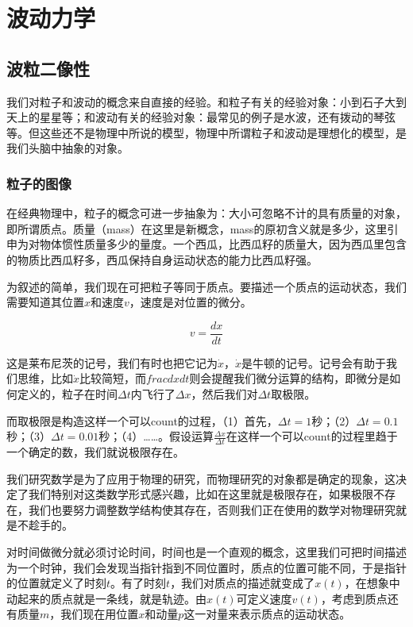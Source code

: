 \section{波动力学}


\subsection{波粒二像性}


我们对粒子和波动的概念来自直接的经验。和粒子有关的经验对象：小到石子大到天上的星星等；和波动有关的经验对象：最常见的例子是水波，还有拨动的琴弦等。但这些还不是物理中所说的模型，物理中所谓粒子和波动是理想化的模型，是我们头脑中抽象的对象。


\subsubsection{粒子的图像}


在经典物理中，粒子的概念可进一步抽象为：大小可忽略不计的具有质量的对象，即所谓质点。质量（mass）在这里是新概念，mass的原初含义就是多少，这里引申为对物体惯性质量多少的量度。一个西瓜，比西瓜籽的质量大，因为西瓜里包含的物质比西瓜籽多，西瓜保持自身运动状态的能力比西瓜籽强。

为叙述的简单，我们现在可把粒子等同于质点。要描述一个质点的运动状态，我们需要知道其位置$x$和速度$v$，速度是对位置的微分。

\begin{equation}
v = \frac{d x}{d t}
\end{equation}

这是莱布尼茨的记号，我们有时也把它记为$\dot x$，$\dot x$是牛顿的记号。记号会有助于我们思维，比如$\dot x$比较简短，而$frac{d x}{d t}$则会提醒我们微分运算的结构，即微分是如何定义的，粒子在时间$\Delta t$内飞行了$\Delta x$，然后我们对$\Delta t$取极限。

而取极限是构造这样一个可以count的过程，（1）首先，$\Delta t = 1$秒；（2）$\Delta t = 0.1$秒；（3）$\Delta t = 0.01$秒；（4）……。假设运算$\frac{\Delta x }{\Delta t}$在这样一个可以count的过程里趋于一个确定的数，我们就说极限存在。

我们研究数学是为了应用于物理的研究，而物理研究的对象都是确定的现象，这决定了我们特别对这类数学形式感兴趣，比如在这里就是极限存在，如果极限不存在，我们也要努力调整数学结构使其存在，否则我们正在使用的数学对物理研究就是不趁手的。

对时间做微分就必须讨论时间，时间也是一个直观的概念，这里我们可把时间描述为一个时钟，我们会发现当指针指到不同位置时，质点的位置可能不同，于是指针的位置就定义了时刻$t$。有了时刻$t$，我们对质点的描述就变成了$x(t)$，在想象中动起来的质点就是一条线，就是轨迹。由$x(t)$可定义速度$v(t)$，考虑到质点还有质量$m$，我们现在用位置$x$和动量$p$这一对量来表示质点的运动状态。


